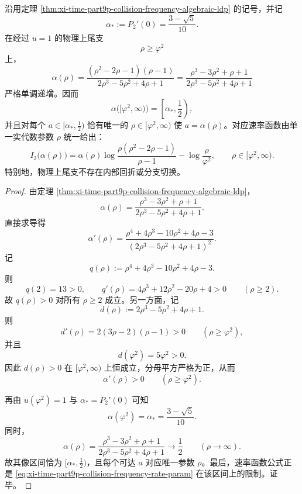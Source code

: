 \begin{theorem}[碰撞势上尾物理支的大偏差率函数单分支统一化]\label{thm:xi-time-part9p-collision-frequency-physical-branch-monotonicity}
沿用定理 \ref{thm:xi-time-part9p-collision-frequency-algebraic-ldp} 的记号，并记
\[
\alpha_\ast:=P_2'(0)=\frac{3-\sqrt5}{10}.
\]
在经过 \(u=1\) 的物理上尾支
\[
\rho\ge \varphi^2
\]
上，
\[
\alpha(\rho)
=
\frac{(\rho^2-2\rho-1)(\rho-1)}{2\rho^3-5\rho^2+4\rho+1}
=
\frac{\rho^3-3\rho^2+\rho+1}{2\rho^3-5\rho^2+4\rho+1}
\]
严格单调递增。因而
\[
\alpha\bigl([\varphi^2,\infty)\bigr)
=
\left[\alpha_\ast,\frac12\right),
\]
并且对每个
\(
a\in[\alpha_\ast,\frac12)
\)
恰有唯一的 \(\rho\in[\varphi^2,\infty)\) 使 \(a=\alpha(\rho)\)。对应速率函数由单一实代数参数 \(\rho\) 统一给出：
\[
I_2\bigl(\alpha(\rho)\bigr)
=
\alpha(\rho)\log\!\frac{\rho(\rho^2-2\rho-1)}{\rho-1}
-\log\!\frac{\rho}{\varphi^2},
\qquad \rho\in[\varphi^2,\infty).
\]
特别地，物理上尾支不存在内部回折或分支切换。
\end{theorem}
\begin{proof}
由定理 \ref{thm:xi-time-part9p-collision-frequency-algebraic-ldp}，
\[
\alpha(\rho)=\frac{\rho^3-3\rho^2+\rho+1}{2\rho^3-5\rho^2+4\rho+1}.
\]
直接求导得
\[
\alpha'(\rho)
=
\frac{\rho^4+4\rho^3-10\rho^2+4\rho-3}{(2\rho^3-5\rho^2+4\rho+1)^2}.
\]
记
\[
q(\rho):=\rho^4+4\rho^3-10\rho^2+4\rho-3.
\]
则
\[
q(2)=13>0,
\qquad
q'(\rho)=4\rho^3+12\rho^2-20\rho+4>0
\qquad(\rho\ge 2).
\]
故 \(q(\rho)>0\) 对所有 \(\rho\ge 2\) 成立。另一方面，记
\[
d(\rho):=2\rho^3-5\rho^2+4\rho+1.
\]
则
\[
d'(\rho)=2(3\rho-2)(\rho-1)>0
\qquad(\rho\ge \varphi^2),
\]
并且
\[
d(\varphi^2)=5\varphi^2>0.
\]
因此 \(d(\rho)>0\) 在 \([\varphi^2,\infty)\) 上恒成立，分母平方严格为正，从而
\[
\alpha'(\rho)>0
\qquad(\rho\ge \varphi^2).
\]

再由 \(u(\varphi^2)=1\) 与
\(
\alpha_\ast=P_2'(0)
\)
可知
\[
\alpha(\varphi^2)=\alpha_\ast=\frac{3-\sqrt5}{10}.
\]
同时，
\[
\alpha(\rho)
=
\frac{\rho^3-3\rho^2+\rho+1}{2\rho^3-5\rho^2+4\rho+1}
\longrightarrow \frac12
\qquad(\rho\to\infty).
\]
故其像区间恰为 \([\alpha_\ast,\frac12)\)，且每个可达 \(a\) 对应唯一参数 \(\rho\)。最后，速率函数公式正是
\eqref{eq:xi-time-part9p-collision-frequency-rate-param} 在该区间上的限制。证毕。
\end{proof}


